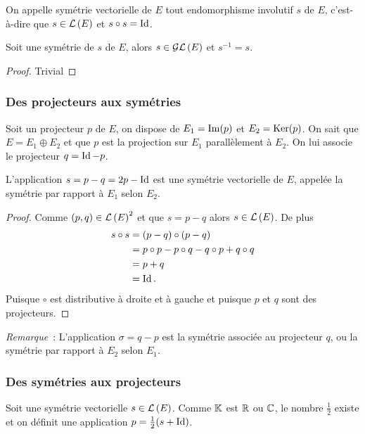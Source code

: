 \begin{defdef}
  On appelle symétrie vectorielle de \(E\) tout endomorphisme involutif \(s\) de
  \(E\), c'est-à-dire que \(s \in \mathcal{L}\left(E\right)\) et \(s \circ s = \operatorname{Id}\).
\end{defdef}

\begin{prop}
  Soit une symétrie de \(s\) de \(E\), alors \(s \in \mathcal{GL}\left(E\right)\) et \(s^{-1}=s\).
\end{prop}
\begin{proof}
  Trivial
\end{proof}

\subsubsection{Des projecteurs aux symétries}

Soit un projecteur \(p\) de \(E\), on dispose de \(E_1=\operatorname{Im}(p)\) et
\(E_2=\operatorname{Ker}(p)\). On sait que \(E=E_1 \oplus E_2\) et que \(p\) est la projection
sur \(E_1\) parallèlement à \(E_2\). On lui associe le projecteur \(q=\operatorname{Id}-p\).

\begin{prop}
  L'application \(s=p-q=2p-\operatorname{Id}\) est une symétrie vectorielle de \(E\), appelée
  la symétrie par rapport à \(E_1\) selon \(E_2\).
\end{prop}
\begin{proof}
  Comme \((p,q) \in \mathcal{L}\left(E\right)^2\) et que \(s=p-q\) alors \(s \in \mathcal{L}\left(E\right)\). De
  plus
  \begin{align}
    s \circ s &=(p-q) \circ (p-q)\\
    &=p \circ p -p \circ q -q \circ p +q \circ q\\
    &=p+q\\
    &=\operatorname{Id}.
  \end{align}
  Puisque \(\circ\) est distributive à droite et à gauche et puisque \(p\) et
  \(q\) sont des projecteurs.
\end{proof}

\emph{Remarque}~: L'application \(\sigma=q-p\) est la symétrie associée au
projecteur \(q\), ou la symétrie par rapport à \(E_2\) selon \(E_1\).

\subsubsection{Des symétries aux projecteurs}

Soit une symétrie vectorielle \(s \in \mathcal{L}\left(E\right)\). Comme \(\mathbb{K}\) est \(\mathbb{R}\) ou
\(\mathbb{C}\), le nombre \(\frac{1}{2}\) existe et on définit une application \(p =
\frac{1}{2}(s+\operatorname{Id})\).

